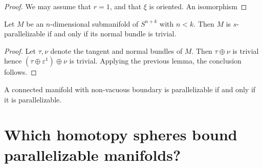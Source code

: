 \begin{proof}
	We may assume that $r=1$, and that $\xi$ is oriented. An isomorphism 
\end{proof}

\begin{lemma}
	Let $M$ be an $n$-dimensional submanifold of $S^{n+k}$ with $n<k$. Then $M$ is $s$-parallelizable if and only if its normal bundle is trivial.
\end{lemma}

\begin{proof}
	Let $\tau, \nu$ denote the tangent and normal bundles of $M$. Then $\tau\oplus \nu$ is trivial hence $(\tau\oplus \varepsilon^1)\oplus \nu$ is trivial. Applying the previous lemma, the conclusion follows.
\end{proof}

\begin{lemma}
	A connected manifold with non-vacuous boundary is parallelizable if and only if it is parallelizable.
\end{lemma}

\section{Which homotopy spheres bound parallelizable manifolds?}
